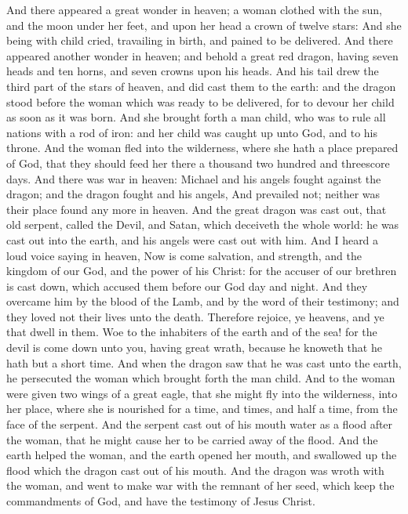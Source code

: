  And there appeared a great wonder in heaven; a woman
clothed with the sun, and the moon under her feet, and upon her head a
crown of twelve stars:  And she being with child cried,
travailing in birth, and pained to be delivered.  And there
appeared another wonder in heaven; and behold a great red dragon, having
seven heads and ten horns, and seven crowns upon his heads. 
And his tail drew the third part of the stars of heaven, and did cast
them to the earth: and the dragon stood before the woman which was ready
to be delivered, for to devour her child as soon as it was born.
 And she brought forth a man child, who was to rule all
nations with a rod of iron: and her child was caught up unto God, and to
his throne.  And the woman fled into the wilderness, where
she hath a place prepared of God, that they should feed her there a
thousand two hundred and threescore days.  And there was war
in heaven: Michael and his angels fought against the dragon; and the
dragon fought and his angels,  And prevailed not; neither
was their place found any more in heaven.  And the great
dragon was cast out, that old serpent, called the Devil, and Satan,
which deceiveth the whole world: he was cast out into the earth, and his
angels were cast out with him.  And I heard a loud voice
saying in heaven, Now is come salvation, and strength, and the kingdom
of our God, and the power of his Christ: for the accuser of our brethren
is cast down, which accused them before our God day and night.
 And they overcame him by the blood of the Lamb, and by the
word of their testimony; and they loved not their lives unto the death.
 Therefore rejoice, ye heavens, and ye that dwell in them.
Woe to the inhabiters of the earth and of the sea! for the devil is come
down unto you, having great wrath, because he knoweth that he hath but a
short time.  And when the dragon saw that he was cast unto
the earth, he persecuted the woman which brought forth the man child.
 And to the woman were given two wings of a great eagle,
that she might fly into the wilderness, into her place, where she is
nourished for a time, and times, and half a time, from the face of the
serpent.  And the serpent cast out of his mouth water as a
flood after the woman, that he might cause her to be carried away of the
flood.  And the earth helped the woman, and the earth
opened her mouth, and swallowed up the flood which the dragon cast out
of his mouth.  And the dragon was wroth with the woman, and
went to make war with the remnant of her seed, which keep the
commandments of God, and have the testimony of Jesus Christ.

